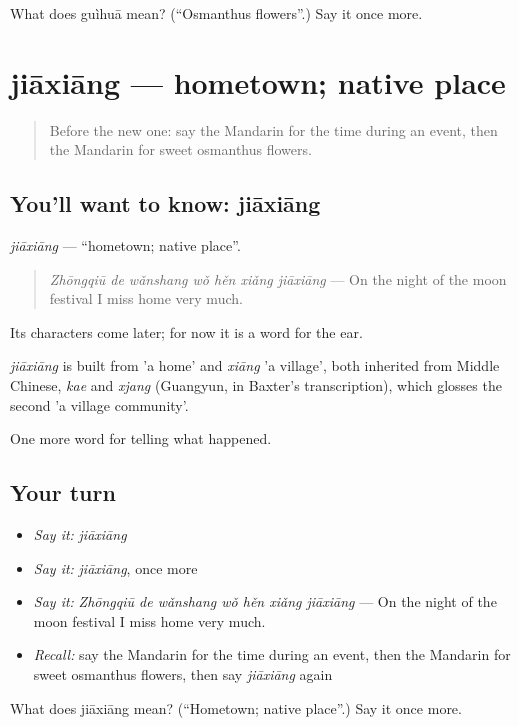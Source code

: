 \begin{tcolorbox}[breakable,colback=teal!4,colframe=teal!35!black,title={Before you move on}]
What does guìhuā mean? (\textquotedblleft{}Osmanthus flowers\textquotedblright{}.) Say it once more.
\end{tcolorbox}
\section[jiāxiāng]{jiāxiāng — hometown; native place}

\label{lesson:ZH-C342-jiaxiang}



\begin{quote}
Before the new one: say the Mandarin for the time during an event, then the Mandarin for sweet osmanthus flowers.
\end{quote}

\subsection*{You'll want to know: jiāxiāng}
\emph{jiāxiāng} — \textquotedblleft{}hometown; native place\textquotedblright{}.

\begin{quote}
\emph{Zhōngqiū de wǎnshang wǒ hěn xiǎng jiāxiāng} — On the night of the moon festival I miss home very much.
\end{quote}

Its characters come later; for now it is a word for the ear.

\begin{cousinweb}
\emph{jiāxiāng} is built from  'a home' and \emph{xiāng} 'a village', both inherited from Middle Chinese, \emph{kae} and \emph{xjang} (Guangyun, in Baxter's transcription), which glosses the second 'a village community'.
\end{cousinweb}

\begin{grammarlens}[title={What you've built}]
One more word for telling what happened.
\end{grammarlens}

\subsection*{Your turn}
\begin{itemize}
\raggedright
  \item \emph{Say it:} \emph{jiāxiāng}
  \item \emph{Say it:} \emph{jiāxiāng}, once more
  \item \emph{Say it:} \emph{Zhōngqiū de wǎnshang wǒ hěn xiǎng jiāxiāng} — On the night of the moon festival I miss home very much.
  \item \emph{Recall:} say the Mandarin for the time during an event, then the Mandarin for sweet osmanthus flowers, then say \emph{jiāxiāng} again
\end{itemize}

\begin{tcolorbox}[breakable,colback=teal!4,colframe=teal!35!black,title={Before you move on}]
What does jiāxiāng mean? (\textquotedblleft{}Hometown; native place\textquotedblright{}.) Say it once more.
\end{tcolorbox}
